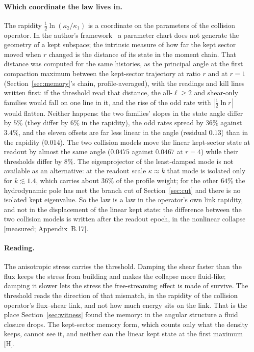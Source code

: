 \documentclass[11pt]{article}
\newcommand{\grade}[1]{\textsf{\small[#1]}}
\begin{document}
\paragraph{Which coordinate the law lives in.} The rapidity $\tfrac12\ln(\kappa_2/\kappa_1)$ is a coordinate on the parameters of the collision operator. In the author's framework~\cite{IQGT} a parameter chart does not generate the geometry of a kept subspace; the intrinsic measure of how far the kept sector moved when $r$ changed is the distance of its state in the moment chain. That distance was computed for the same histories, as the principal angle at the first compaction maximum between the kept-sector trajectory at ratio $r$ and at $r=1$ (Section~\ref{sec:memory}'s chain, profile-averaged), with the readings and kill lines written first: if the threshold read that distance, the all-$\ell\ge2$ and shear-only families would fall on one line in it, and the rise of the odd rate with $|\tfrac12\ln r|$ would flatten. Neither happens: the two families' slopes in the state angle differ by $5\%$ (they differ by $6\%$ in the rapidity), the odd rates spread by $36\%$ against $3.4\%$, and the eleven offsets are far less linear in the angle (residual $0.13$) than in the rapidity ($0.014$). The two collision models move the linear kept-sector state at readout by almost the same angle ($0.0475$ against $0.0467$ at $r=4$) while their thresholds differ by $8\%$. The eigenprojector of the least-damped mode is not available as an alternative: at the readout scale $\kappa\approx k$ that mode is isolated only for $k\lesssim1.4$, which carries about $36\%$ of the profile weight; for the other $64\%$ the hydrodynamic pole has met the branch cut of Section~\ref{sec:cut} and there is no isolated kept eigenvalue. So the law is a law in the operator's own link rapidity, and not in the displacement of the linear kept state: the difference between the two collision models is written after the readout epoch, in the nonlinear collapse \grade{measured; Appendix~B.17}.

\paragraph{Reading.} The anisotropic stress carries the threshold. Damping the shear faster than the flux keeps the stress from building and makes the collapse more fluid-like; damping it slower lets the stress the free-streaming effect is made of survive. The threshold reads the direction of that mismatch, in the rapidity of the collision operator's flux--shear link, and not how much energy sits on the link. That is the place Section~\ref{sec:witness} found the memory: in the angular structure a fluid closure drops. The kept-sector memory form, which counts only what the density keeps, cannot see it, and neither can the linear kept state at the first maximum \grade{H}.
\end{document}

